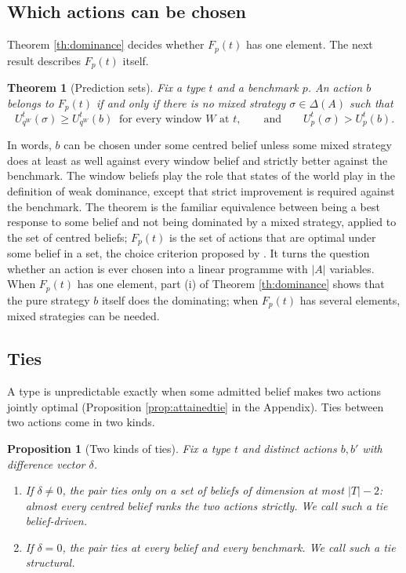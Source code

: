 \documentclass[12pt]{article}
\newtheorem{theorem}{Theorem}
\newtheorem{proposition}{Proposition}
\theoremstyle{definition}
\begin{document}
\subsection{Which actions can be chosen}

Theorem \ref{th:dominance} decides whether $F_p(t)$ has one element. The next result describes $F_p(t)$ itself.

\begin{theorem}[Prediction sets]\label{th:dual}
Fix a type $t$ and a benchmark $p$. An action $b$ belongs to $F_p(t)$ if and only if there is no mixed strategy $\sigma \in \Delta(A)$ such that
\[
U^t_{q^W}(\sigma) \ge U^t_{q^W}(b) \ \text{ for every window } W \text{ at } t, \qquad \text{and} \qquad U^t_{p}(\sigma) > U^t_{p}(b).
\]
\end{theorem}

In words, $b$ can be chosen under some centred belief unless some mixed strategy does at least as well against every window belief and strictly better against the benchmark. The window beliefs play the role that states of the world play in the definition of weak dominance, except that strict improvement is required against the benchmark. The theorem is the familiar equivalence between being a best response to some belief and not being dominated by a mixed strategy, applied to the set of centred beliefs; $F_p(t)$ is the set of actions that are optimal under some belief in a set, the choice criterion proposed by \citet{levi1974}. It turns the question whether an action is ever chosen into a linear programme with $|A|$ variables. When $F_p(t)$ has one element, part (i) of Theorem \ref{th:dominance} shows that the pure strategy $b$ itself does the dominating; when $F_p(t)$ has several elements, mixed strategies can be needed.

\subsection{Ties}\label{sec:ties}

A type is unpredictable exactly when some admitted belief makes two actions jointly optimal (Proposition \ref{prop:attainedtie} in the Appendix). Ties between two actions come in two kinds.

\begin{proposition}[Two kinds of ties]\label{th:sources}
Fix a type $t$ and distinct actions $b, b'$ with difference vector $\delta$.
\begin{enumerate}
\item[(i)] If $\delta \neq 0$, the pair ties only on a set of beliefs of dimension at most $|T| - 2$: almost every centred belief ranks the two actions strictly. We call such a tie \emph{belief-driven}.
\item[(ii)] If $\delta = 0$, the pair ties at every belief and every benchmark. We call such a tie \emph{structural}.
\end{enumerate}
\end{proposition}
\end{document}
